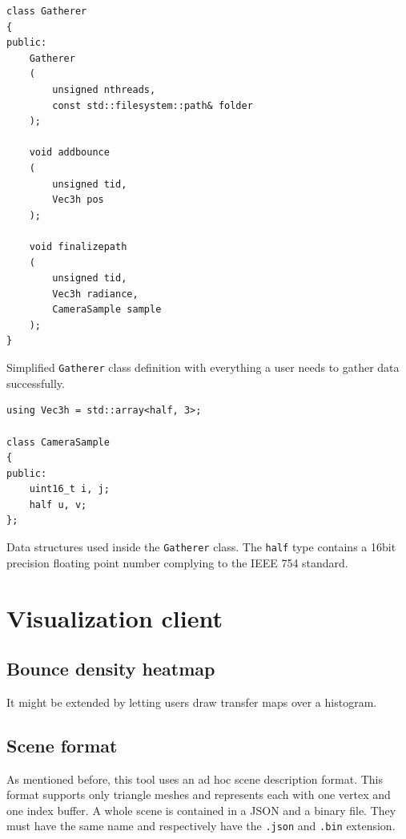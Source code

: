 \begin{Listing}
	\begin{lstlisting}
class Gatherer
{
public:
	Gatherer
	(
		unsigned nthreads, 
		const std::filesystem::path& folder
	);

	void addbounce
	(
		unsigned tid, 
		Vec3h pos
	);

	void finalizepath
	(
		unsigned tid, 
		Vec3h radiance, 
		CameraSample sample
	);
}
	\end{lstlisting}
	\caption{Simplified \texttt{Gatherer} class definition with everything a user needs to gather data successfully.}
	\label{gatherer_signatures}
\end{Listing}

\begin{Listing}
	\begin{lstlisting}
using Vec3h = std::array<half, 3>;

class CameraSample
{
public:
	uint16_t i, j;
	half u, v;
};
	\end{lstlisting}
	\caption{Data structures used inside the \texttt{Gatherer} class. The \texttt{half} type contains a 16bit precision floating point number complying to the IEEE 754 standard.}
	\label{gatherer_datastructures}
\end{Listing}


\section{Visualization client}

\subsection{Bounce density heatmap}
It might be extended by letting users draw transfer maps over a histogram.

\subsection{Scene format}
\label{scene_format}

As mentioned before, this tool uses an ad hoc scene description format. This format supports only triangle meshes and represents each with one vertex and one index buffer. A whole scene is contained in a JSON \cite{rfc8259} and a binary file. They must have the same name and respectively have the \texttt{.json} and \texttt{.bin} extension. 

